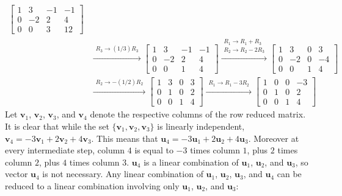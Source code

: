 \documentclass{article}
\begin{document}
\begin{itemize}
\begin{align*}
\begin{bmatrix}
1 &  3 & -1 & -1 \\
0 & -2 &  2 &  4 \\
0 &  0 &  3 & 12 
\end{bmatrix} \\ 
& \xrightarrow{\begin{array}{c} R_3 \rightarrow (1/3)R_3 \end{array}} \begin{bmatrix}
1 &  3 & -1 & -1 \\
0 & -2 &  2 &  4 \\
0 &  0 &  1 &  4 
\end{bmatrix} \xrightarrow{\begin{array}{c} R_1 \rightarrow R_1 + R_3 \\ R_2 \rightarrow R_2 - 2R_3 \end{array}} \begin{bmatrix}
1 &  3 & 0 &  3 \\
0 & -2 & 0 & -4 \\
0 &  0 & 1 &   4 
\end{bmatrix} \\  
& \xrightarrow{\begin{array}{c} R_2 \rightarrow -(1/2)R_2 \end{array}} \begin{bmatrix}
1 & 3 & 0 & 3 \\
0 & 1 & 0 & 2 \\
0 & 0 & 1 & 4 
\end{bmatrix}
\xrightarrow{\begin{array}{c} R_1 \rightarrow R_1 - 3R_2 \end{array}} \begin{bmatrix}
1 & 0 & 0 & -3 \\
0 & 1 & 0 &  2 \\
0 & 0 & 1 &  4 
\end{bmatrix}
\end{align*}
Let \(\mathbf{v}_1\), \(\mathbf{v}_2\), \(\mathbf{v}_3\), and \(\mathbf{v}_4\) denote the respective columns of the row reduced matrix. It is clear that while the set \(\{\mathbf{v}_1, \mathbf{v}_2, \mathbf{v}_3\}\) is linearly independent, \(\mathbf{v}_4 = -3\mathbf{v}_1 + 2\mathbf{v}_2 + 4\mathbf{v}_3\). This means that \(\mathbf{u}_4 = -3\mathbf{u}_1 + 2\mathbf{u}_2 + 4\mathbf{u}_3\). Moreover at every intermediate step, column \(4\) is equal to \(-3\) times column \(1\), plus \(2\) times column \(2\), plus \(4\) times column \(3\). \(\mathbf{u}_4\) is a linear combination of \(\mathbf{u}_1\), \(\mathbf{u}_2\), and \(\mathbf{u}_3\), so vector \(\mathbf{u}_4\) is not necessary. Any linear combination of \(\mathbf{u}_1\), \(\mathbf{u}_2\), \(\mathbf{u}_3\), and \(\mathbf{u}_4\) can be reduced to a linear combination involving only \(\mathbf{u}_1\), \(\mathbf{u}_2\), and \(\mathbf{u}_3\):


\end{itemize}
\end{document}
